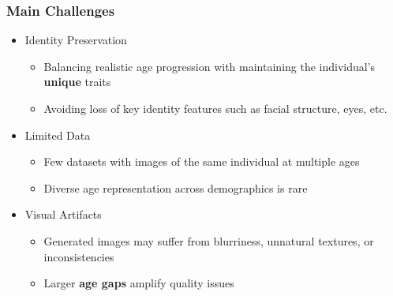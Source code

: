 \documentclass[aspectratio=169]{beamer}
\begin{document}

\begin{frame}
\frametitle{Main Challenges}
\justifying

\begin{itemize}
    \item Identity Preservation
    \begin{itemize}
            \item Balancing realistic age progression with maintaining the individual’s \textbf{unique} traits
            \item Avoiding loss of key identity features such as facial structure, eyes, etc.
    \end{itemize}
\end{itemize}

\begin{itemize}
    \item Limited Data
    \begin{itemize}
            \item Few datasets with images of the same individual at multiple ages
            \item Diverse age representation across demographics is rare
    \end{itemize}
\end{itemize}

\begin{itemize}
    \item Visual Artifacts
    \begin{itemize}
            \item Generated images may suffer from blurriness, unnatural textures, or inconsistencies
            \item Larger \textbf{age gaps} amplify quality issues
    \end{itemize}
\end{itemize}


\end{frame}

\end{document}
